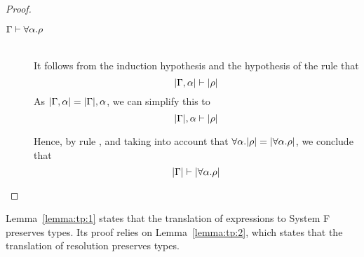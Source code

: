 \begin{proof}
\begin{description}
\item[\quad$\Gamma \vdash \forall\alpha.\rho$] \ \\
  It follows from the induction hypothesis and the hypothesis of the rule that
\begin{equation*}
  |\Gamma,\alpha| \vdash |\rho|
\end{equation*}
  As $|\Gamma,\alpha| = |\Gamma|,\alpha$, we can simplify this to
\begin{equation*}
  |\Gamma|,\alpha \vdash |\rho|
\end{equation*}

  Hence, by rule , and taking into account that
  $\forall\alpha.|\rho| = |\forall\alpha.\rho|$, we conclude that
\begin{equation*}
  |\Gamma| \vdash |\forall\alpha.\rho|
\end{equation*}

\end{description}
\end{proof}


Lemma~\ref{lemma:tp:1} states that the translation of expressions to System F preserves
types. Its proof relies on Lemma~\ref{lemma:tp:2}, which states that the translation
of resolution preserves types.

{\centering
{}}

